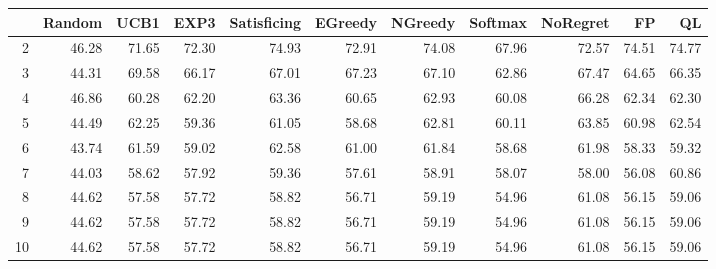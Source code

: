 \begin{table}[ht]
\centering
\begin{tabular}{rrrrrrrrrrr}
  \hline
 & Random & UCB1 & EXP3 & Satisficing & EGreedy & NGreedy & Softmax & NoRegret & FP & QL \\ 
  \hline
2 & 46.28 & 71.65 & 72.30 & 74.93 & 72.91 & 74.08 & 67.96 & 72.57 & 74.51 & 74.77 \\ 
  3 & 44.31 & 69.58 & 66.17 & 67.01 & 67.23 & 67.10 & 62.86 & 67.47 & 64.65 & 66.35 \\ 
  4 & 46.86 & 60.28 & 62.20 & 63.36 & 60.65 & 62.93 & 60.08 & 66.28 & 62.34 & 62.30 \\ 
  5 & 44.49 & 62.25 & 59.36 & 61.05 & 58.68 & 62.81 & 60.11 & 63.85 & 60.98 & 62.54 \\ 
  6 & 43.74 & 61.59 & 59.02 & 62.58 & 61.00 & 61.84 & 58.68 & 61.98 & 58.33 & 59.32 \\ 
  7 & 44.03 & 58.62 & 57.92 & 59.36 & 57.61 & 58.91 & 58.07 & 58.00 & 56.08 & 60.86 \\ 
  8 & 44.62 & 57.58 & 57.72 & 58.82 & 56.71 & 59.19 & 54.96 & 61.08 & 56.15 & 59.06 \\ 
  9 & 44.62 & 57.58 & 57.72 & 58.82 & 56.71 & 59.19 & 54.96 & 61.08 & 56.15 & 59.06 \\ 
  10 & 44.62 & 57.58 & 57.72 & 58.82 & 56.71 & 59.19 & 54.96 & 61.08 & 56.15 & 59.06 \\ 
   \hline
\end{tabular}
\end{table}

